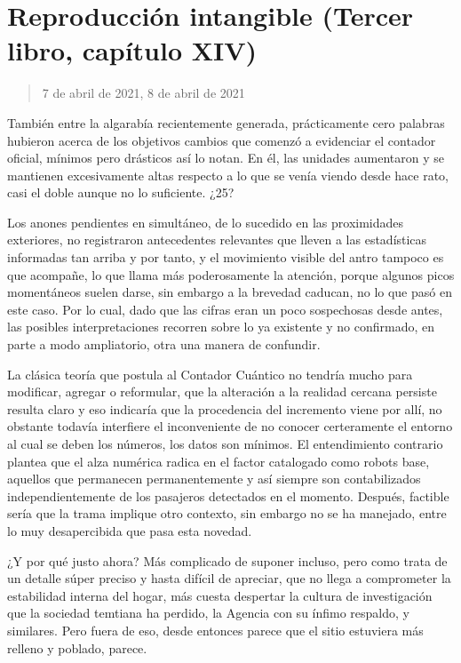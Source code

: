 \documentclass[
]{book}
\begin{document}
\hypertarget{reproducciuxf3n-intangible-tercer-libro-capuxedtulo-xiv}{%
\section{Reproducción intangible (Tercer libro, capítulo XIV)}\label{reproducciuxf3n-intangible-tercer-libro-capuxedtulo-xiv}}

\begin{quote}
7 de abril de 2021, 8 de abril de 2021
\end{quote}

También entre la algarabía recientemente generada, prácticamente cero palabras hubieron acerca de los objetivos cambios que comenzó a evidenciar el contador oficial, mínimos pero drásticos así lo notan. En él, las unidades aumentaron y se mantienen excesivamente altas respecto a lo que se venía viendo desde hace rato, casi el doble aunque no lo suficiente. ¿25?

Los anones pendientes en simultáneo, de lo sucedido en las proximidades exteriores, no registraron antecedentes relevantes que lleven a las estadísticas informadas tan arriba y por tanto, y el movimiento visible del antro tampoco es que acompañe, lo que llama más poderosamente la atención, porque algunos picos momentáneos suelen darse, sin embargo a la brevedad caducan, no lo que pasó en este caso. Por lo cual, dado que las cifras eran un poco sospechosas desde antes, las posibles interpretaciones recorren sobre lo ya existente y no confirmado, en parte a modo ampliatorio, otra una manera de confundir.

La clásica teoría que postula al Contador Cuántico no tendría mucho para modificar, agregar o reformular, que la alteración a la realidad cercana persiste resulta claro y eso indicaría que la procedencia del incremento viene por allí, no obstante todavía interfiere el inconveniente de no conocer certeramente el entorno al cual se deben los números, los datos son mínimos. El entendimiento contrario plantea que el alza numérica radica en el factor catalogado como robots base, aquellos que permanecen permanentemente y así siempre son contabilizados independientemente de los pasajeros detectados en el momento. Después, factible sería que la trama implique otro contexto, sin embargo no se ha manejado, entre lo muy desapercibida que pasa esta novedad.

¿Y por qué justo ahora? Más complicado de suponer incluso, pero como trata de un detalle súper preciso y hasta difícil de apreciar, que no llega a comprometer la estabilidad interna del hogar, más cuesta despertar la cultura de investigación que la sociedad temtiana ha perdido, la Agencia con su ínfimo respaldo, y similares. Pero fuera de eso, desde entonces parece que el sitio estuviera más relleno y poblado, parece.
\end{document}
